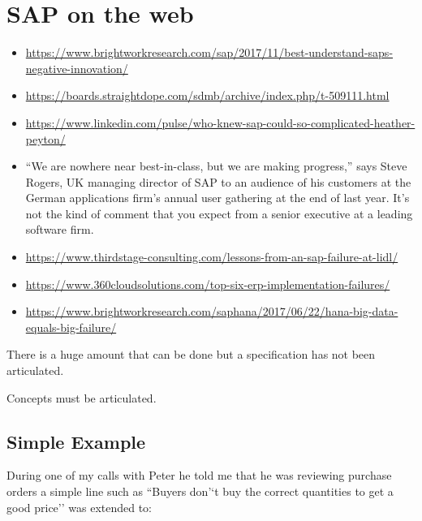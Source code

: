 \documentclass[letterpaper,10pt,english]{sphinxmanual}
\begin{document}
\chapter{SAP on the web}
\label{BusinessProcessReengineering:sap-on-the-web}\begin{itemize}
\item {} 
\href{https://www.brightworkresearch.com/sap/2017/11/best-understand-saps-negative-innovation/}{https://www.brightworkresearch.com/sap/2017/11/best-understand-saps-negative-innovation/}

\item {} 
\href{https://boards.straightdope.com/sdmb/archive/index.php/t-509111.html}{https://boards.straightdope.com/sdmb/archive/index.php/t-509111.html}

\item {} 
\href{https://www.linkedin.com/pulse/who-knew-sap-could-so-complicated-heather-peyton/}{https://www.linkedin.com/pulse/who-knew-sap-could-so-complicated-heather-peyton/}

\item {} 
``We are nowhere near best-in-class, but we are making progress,'' says
Steve Rogers, UK managing director of SAP to an audience of his
customers at the German applications firm's annual user gathering at
the end of last year. It's not the kind of comment that you expect
from a senior executive at a leading software firm.

\item {} 
\href{https://www.thirdstage-consulting.com/lessons-from-an-sap-failure-at-lidl/}{https://www.thirdstage-consulting.com/lessons-from-an-sap-failure-at-lidl/}

\item {} 
\href{https://www.360cloudsolutions.com/top-six-erp-implementation-failures/}{https://www.360cloudsolutions.com/top-six-erp-implementation-failures/}

\item {} 
\href{https://www.brightworkresearch.com/saphana/2017/06/22/hana-big-data-equals-big-failure/}{https://www.brightworkresearch.com/saphana/2017/06/22/hana-big-data-equals-big-failure/}

\end{itemize}

There is a huge amount that can be done but a specification has not been
articulated.

Concepts must be articulated.


\section{Simple Example}
\label{BusinessProcessReengineering:simple-example}
During one of my calls with Peter he told me that he was reviewing
purchase orders a simple line such as ``Buyers don'`t buy the correct
quantities to get a good price'' was extended to:
\end{document}
